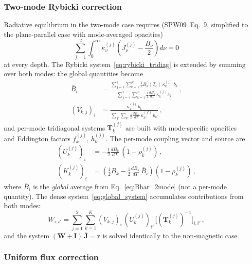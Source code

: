 \subsubsection{Two-mode Rybicki correction}

Radiative equilibrium in the two-mode case requires (SPW09~Eq.~9, simplified to the plane-parallel case with mode-averaged opacities)
\begin{equation}
  \sum_{j=1}^{2}\int_0^\infty
  \kappa^{(j)}_\nu\!\left(J^{(j)}_\nu - \frac{B_\nu}{2}\right)d\nu = 0
  \label{eq:rad_eq_2mode}
\end{equation}
at every depth. The Rybicki system~\eqref{eq:rybicki_tridiag} is extended by summing over both modes: the global quantities become
\begin{align}
  \bar{B}_i &= \frac{\sum_{j=1}^{2}\sum_{k=1}^{K}
    \frac{1}{2}B_k(T_0)\,\kappa^{(j)}_k\,b_k}
    {\sum_{j=1}^{2}\sum_{k=1}^{K}
    \frac{1}{2}\frac{dB_k}{dT}\,\kappa^{(j)}_k\,b_k}\,,
  \label{eq:Bbar_2mode}\\[4pt]
  (V_{k,j})_i &= \frac{\kappa^{(j)}_k\,b_k}
    {\sum_{j'}\sum_{k'}\frac{1}{2}\frac{dB_{k'}}{dT}\,\kappa^{(j')}_{k'}\,b_{k'}}\,,
  \label{eq:Vk_2mode}
\end{align}
and per-mode tridiagonal systems $\mathbf{T}^{(j)}_k$ are built with mode-specific opacities and Eddington factors $f^{(j)}_k$, $h^{(j)}_k$. The per-mode coupling vector and source are
\begin{align}
  (U^{(j)}_k)_i &= -\tfrac{1}{2}\frac{dB_k}{dT}\,(1-\rho^{(j)}_k)\,,\\
  (K^{(j)}_k)_i &= \left(\tfrac{1}{2}B_k
    - \tfrac{1}{2}\frac{dB_k}{dT}\,\bar{B}_i\right)(1-\rho^{(j)}_k)\,,
\end{align}
where $\bar{B}_i$ is the \emph{global} average from Eq.~\eqref{eq:Bbar_2mode} (not a per-mode quantity). The dense system~\eqref{eq:global_system} accumulates contributions from both modes:
\begin{equation}
  W_{i,i'} = \sum_{j=1}^{2}\sum_{k=1}^{K}
    (V_{k,j})_i\,(U^{(j)}_k)_{i'}\,
    \bigl[(\mathbf{T}^{(j)}_k)^{-1}\bigr]_{i,i'}\,,
  \label{eq:W_2mode}
\end{equation}
and the system $(\mathbf{W}+\mathbf{I})\,\bar{\mathbf{J}} = \mathbf{r}$ is solved identically to the non-magnetic case.

\subsubsection{Uniform flux correction}

